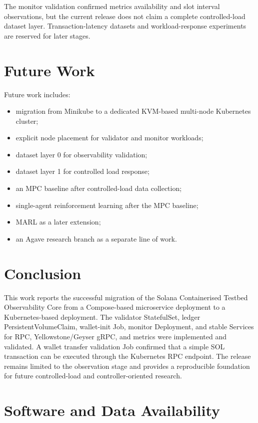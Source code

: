 \documentclass[11pt,a4paper]{article}
\begin{document}
The monitor validation confirmed metrics availability and slot interval observations, but the current release does not claim a complete controlled-load dataset layer. Transaction-latency datasets and workload-response experiments are reserved for later stages.

\section{Future Work}

Future work includes:

\begin{itemize}
  \item migration from Minikube to a dedicated KVM-based multi-node Kubernetes cluster;
  \item explicit node placement for validator and monitor workloads;
  \item dataset layer 0 for observability validation;
  \item dataset layer 1 for controlled load response;
  \item an MPC baseline after controlled-load data collection;
  \item single-agent reinforcement learning after the MPC baseline;
  \item MARL as a later extension;
  \item an Agave research branch as a separate line of work.
\end{itemize}

\section{Conclusion}

This work reports the successful migration of the Solana Containerised Testbed Observability Core from a Compose-based microservice deployment to a Kubernetes-based deployment. The validator StatefulSet, ledger PersistentVolumeClaim, wallet-init Job, monitor Deployment, and stable Services for RPC, Yellowstone/Geyser gRPC, and metrics were implemented and validated. A wallet transfer validation Job confirmed that a simple SOL transaction can be executed through the Kubernetes RPC endpoint. The release remains limited to the observation stage and provides a reproducible foundation for future controlled-load and controller-oriented research.

\section*{Software and Data Availability}
\end{document}
